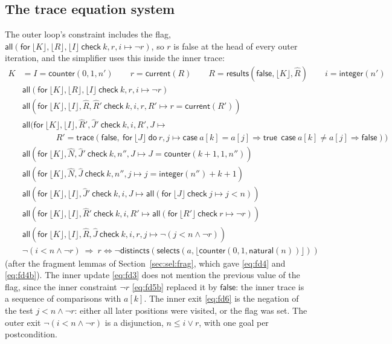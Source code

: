 \documentclass[11pt,a4paper]{article}
\newcommand{\bl}[1]{\lfloor #1\rfloor}                       %
\newcommand{\tr}[3]{\mathsf{trace}(#1,\ \mathsf{for}\ #2\ \mathsf{do}\ #3)}
\newcommand{\al}[2]{\mathsf{all}(\mathsf{for}\ #1\ \mathsf{check}\ #2)}
\newcommand{\cnt}{\mathsf{counter}}
\newcommand{\cur}{\mathsf{current}}
\newcommand{\intf}{\mathsf{integer}}
\newcommand{\natf}{\mathsf{natural}}
\newcommand{\upd}[2]{\mathsf{case}\ #1 \Rightarrow #2}
\newcommand{\seq}[1]{\hat{#1}}                               %
\begin{document}
\subsection{The trace equation system}
The outer loop's constraint includes the flag, $\al{\bl{K}, \bl{R}, \bl{I}}{k, r, i \mapsto \neg r}$, so
$r$ is false at the head of every outer iteration, and the simplifier uses this inside the inner trace:
\begin{align}
  K &= I = \cnt(0, 1, n') \qquad r = \cur(R) \qquad R = \mathsf{results}(\mathsf{false}, \bl{K}, \seq{R}) \qquad i = \intf(n') \label{eq:fd0}\\
  &\al{\bl{K}, \bl{R}, \bl{I}}{k, r, i \mapsto \neg r} \label{eq:fd1}\\
  &\al{\bl{K}, \bl{I}, \seq{R}, \seq{R}'}{k, i, r, R' \mapsto r = \cur(R')} \label{eq:fd2}\\
  &\al{\bl{K}, \bl{I}, \seq{R}', \seq{J}'}{k, i, R', J \mapsto {}\nonumber\\
  &\qquad\qquad R' = \tr{\mathsf{false}}{\bl{J}}{r, j \mapsto \upd{a[k] = a[j]}{\mathsf{true}}\ \ \upd{a[k] \ne a[j]}{\mathsf{false}}}} \label{eq:fd3}\\
  &\al{\bl{K}, \seq{N}, \seq{J}'}{k, n'', J \mapsto J = \cnt(k + 1, 1, n'')} \label{eq:fd4}\\
  &\al{\bl{K}, \seq{N}, \seq{J}}{k, n'', j \mapsto j = \intf(n'') + k + 1} \label{eq:fd4b}\\
  &\al{\bl{K}, \bl{I}, \seq{J}'}{k, i, J \mapsto \al{\bl{J}}{j \mapsto j < n}} \label{eq:fd5}\\
  &\al{\bl{K}, \bl{I}, \seq{R}'}{k, i, R' \mapsto \al{\bl{R'}}{r \mapsto \neg r}} \label{eq:fd5b}\\
  &\al{\bl{K}, \bl{I}, \seq{R}, \seq{J}}{k, i, r, j \mapsto \neg(j < n \wedge \neg r)} \label{eq:fd6}\\
  &\neg(i < n \wedge \neg r)\ \Longrightarrow\ r \Leftrightarrow \neg\mathsf{distincts}(\mathsf{selects}(a, \bl{\cnt(0, 1, \natf(n))})) \nonumber
\end{align}
(after the fragment lemmas of Section~\ref{sec:sel:frag}, which gave \eqref{eq:fd4} and \eqref{eq:fd4b}). The inner update
\eqref{eq:fd3} does not mention the previous value of the flag, since the inner constraint
$\neg r$ \eqref{eq:fd5b} replaced it by $\mathsf{false}$: the inner trace is a sequence of comparisons
with $a[k]$. The inner exit \eqref{eq:fd6} is the negation of the test $j < n \wedge \neg r$: either all
later positions were visited, or the flag was set. The outer exit $\neg(i < n \wedge \neg r)$ is a
disjunction, $n \le i \vee r$, with one goal per postcondition.
\end{document}
